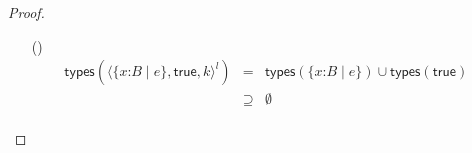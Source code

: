 \documentclass[9pt]{extarticle}
\newcommand{\ottnt}[1]{\mathit{#1}}
\begin{document}
\begin{lemma}
\begin{proof}
{\begin{itemize}
\[\begin{array}{rclr}
         \mathsf{types} (  \langle   \{ \mathit{x} \mathord{:} \ottnt{B} \mathrel{\mid} \ottnt{e_{{\mathrm{1}}}} \}   \mathord{ \overset{ \bullet }{\Rightarrow} }   \{ \mathit{x} \mathord{:} \ottnt{B} \mathrel{\mid} \ottnt{e_{{\mathrm{2}}}} \}   \rangle^{ \ottnt{l} } ~  \ottnt{k}  )  &=&     \mathsf{types} (  \{ \mathit{x} \mathord{:} \ottnt{B} \mathrel{\mid} \ottnt{e_{{\mathrm{1}}}} \}  )   \cup   \mathsf{types} ( \bullet )    \cup   \mathsf{types} (  \{ \mathit{x} \mathord{:} \ottnt{B} \mathrel{\mid} \ottnt{e_{{\mathrm{2}}}} \}  )    \cup   \mathsf{types} ( \ottnt{k} )   & \\
        &\supseteq&   \mathsf{types} (  \{ \mathit{x} \mathord{:} \ottnt{B} \mathrel{\mid} \ottnt{e_{{\mathrm{2}}}} \}  )   \cup   \mathsf{types} ( \ottnt{k} )   & \\
        &=&    \set{   \{ \mathit{x} \mathord{:} \ottnt{B} \mathrel{\mid} \ottnt{e_{{\mathrm{2}}}} \}   }   \cup   \mathsf{types} ( \ottnt{e_{{\mathrm{2}}}} )    \cup   \mathsf{types} ( \ottnt{k} )   & \\
        &=&    \mathsf{types} (  \{ \mathit{x} \mathord{:} \ottnt{B} \mathrel{\mid} \ottnt{e_{{\mathrm{2}}}} \}  )   \cup   \mathsf{types} ( \ottnt{e_{{\mathrm{2}}}} )    \cup   \mathsf{types} ( \ottnt{k} )   & \\
        &\supseteq&   \mathsf{types} (  \{ \mathit{x} \mathord{:} \ottnt{B} \mathrel{\mid} \ottnt{e_{{\mathrm{2}}}} \}  )   \cup   \mathsf{types} (  \ottnt{e_{{\mathrm{2}}}}  [  \ottnt{k} / \mathit{x}  ]  )   & \text{(Lemma~\ref{lem:typessubstitution})} \\
        &=&  \mathsf{types} (  \{ \mathit{x} \mathord{:} \ottnt{B} \mathrel{\mid} \ottnt{e_{{\mathrm{2}}}} \}  )  & \text{since $ \mathsf{types} ( \ottnt{k} )  =  \bullet $}\\
        &=&  \mathsf{types} (  \langle   \{ \mathit{x} \mathord{:} \ottnt{B} \mathrel{\mid} \ottnt{e_{{\mathrm{2}}}} \}  ,   \ottnt{e_{{\mathrm{2}}}}  [  \ottnt{k} / \mathit{x}  ]  ,  \ottnt{k}  \rangle^{ \ottnt{l} }  ) 
      \end{array} \]
    \item[(\E{CheckOK})]  \[ \begin{array}{rclr}
         \mathsf{types} (  \langle   \{ \mathit{x} \mathord{:} \ottnt{B} \mathrel{\mid} \ottnt{e} \}  ,   \mathsf{true}  ,  \ottnt{k}  \rangle^{ \ottnt{l} }  )  &=&   \mathsf{types} (  \{ \mathit{x} \mathord{:} \ottnt{B} \mathrel{\mid} \ottnt{e} \}  )   \cup   \mathsf{types} (  \mathsf{true}  )   & \\
        &\supseteq&  \emptyset  & \\

\end{array}\]
\end{itemize}}
\end{proof}
\end{lemma}
\end{document}
